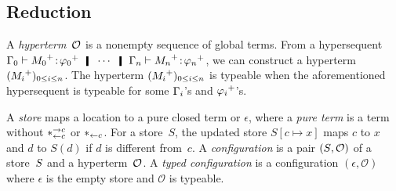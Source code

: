 
\subsection{Reduction}

A \textit{hyperterm}~$\mathcal{O}$ is a nonempty sequence
of global terms.
From a hypersequent $\G_0\tr\tj{\m{M_0}}{\m{\phi_0}}\hmid \cdots \hmid
\G_n\tr\tj{\m{M_n}}{\m{\phi_n}}$,
we can construct a hyperterm $({M_i}^+)_{0\le i \le n}$.
The hyperterm $({M_i}^+)_{0\le i \le n}$ is typeable when the
aforementioned hypersequent is typeable for some $\Gamma_i$'s and ${\varphi_i}^+$'s.

A \textit{store} maps a location to a pure closed term or $\epsilon$,
where a \textit{pure term} is a term
without $\ast^{\rightarrow {c}}_{\leftarrow{c}}$ or $\ast_{\leftarrow{c}}$.
For a store~$S$, the updated store $S[c\mapsto x]$ maps $c$ to
$x$ and $d$ to $S(d)$ if $d$ is different from~$c$.
A \textit{configuration} is a pair $({S}{},{\mathcal{O}})$ of a
store~${S}$ and a hyperterm~$\mathcal{O}$.
A \textit{typed configuration} is a
configuration $(\epsilon, \mathcal O)$ where $\epsilon$ is the empty
store and $\mathcal O$ is typeable.

